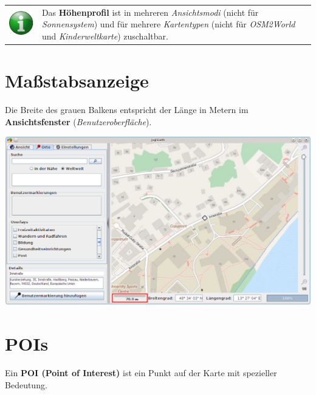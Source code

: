 \documentclass[10pt]{scrreprt}
\newcommand{\textref}[1]{\mbox{\raisebox{0.1ex}{\small$\rightarrow$ }\textit{#1}}}
\begin{document}
\vspace{3mm}
\begin{tabular}{>{\centering \arraybackslash}m{1cm} m{14cm}}
\includegraphics[scale=0.5]{images/info.eps} & Das \textbf{Höhenprofil} ist in mehreren \textref{Ansichtsmodi} (nicht für \textref{Sonnensystem}) und für mehrere \textref{Kartentypen} (nicht für \textref{OSM2World} und \textref{Kinderweltkarte}) zuschaltbar. \\ 
\end{tabular} 




\newpage
\section{Maßstabsanzeige} 
Die Breite des grauen Balkens entspricht der Länge in Metern im \textbf{Ansichtsfenster} (\textref{Benutzeroberfläche}).

\vspace{3mm}
\begin{center}
\includegraphics[scale=0.3]{images/flacheKarte_massstab.png}
\end{center}




\vspace{3mm}
\section{POIs} 
Ein \textbf{POI (Point of Interest)} ist ein Punkt auf der Karte mit spezieller Bedeutung.
\end{document}

